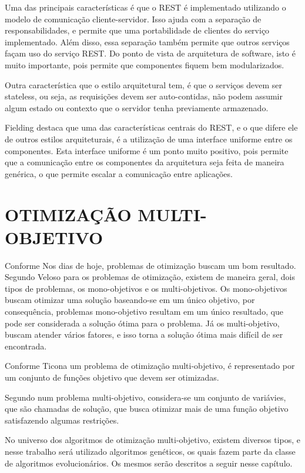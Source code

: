 Uma das principais características é que o REST é implementado utilizando o modelo de comunicação 
cliente-servidor. Isso ajuda com a separação de responsabilidades, e permite que uma portabilidade 
de clientes do serviço implementado. Além disso, essa separação também permite que outros serviços 
façam uso do serviço REST. Do ponto de vista de arquitetura de software, isto é muito importante, 
pois permite que componentes fiquem bem modularizados.

Outra característica que o estilo arquitetural tem, é que o serviços devem ser stateless, ou seja, as  
requisições devem ser auto-contidas, não podem assumir algum estado ou contexto que o servidor tenha 
previamente armazenado. 

Fielding \cite{fielding} destaca que uma das características centrais do REST, e o que difere ele 
de outros estilos arquiteturais, é a utilização de uma interface uniforme entre os componentes. 
Esta interface uniforme é um ponto muito positivo, pois permite que a comunicação entre os 
componentes da arquitetura seja feita de maneira genérica, o que permite escalar a comunicação 
entre aplicações.

\section{OTIMIZAÇÃO MULTI-OBJETIVO}  
Conforme Nos dias de hoje, problemas de otimização buscam um bom resultado.
Segundo Veloso \cite{veloso} para os problemas de otimização, existem de maneira geral, 
dois tipos de problemas, os mono-objetivos e os multi-objetivos. 
Os mono-objetivos buscam otimizar uma solução baseando-se em um único objetivo, por consequência, 
problemas mono-objetivo resultam em um único resultado, que pode ser considerada a solução ótima para o 
problema. Já os multi-objetivo, buscam atender vários fatores, e isso torna a solução ótima mais 
difícil de ser encontrada.

Conforme Ticona \cite{ticona} um problema de otimização multi-objetivo, é representado por um 
conjunto de funções objetivo que devem ser otimizadas. 

Segundo \cite{Hashimoto} num problema multi-objetivo, considera-se um conjunto de 
variávies, que são chamadas de solução, que busca otimizar mais de uma função objetivo 
satisfazendo algumas restrições. 

No universo dos algoritmos de otimização multi-objetivo, existem diversos tipos, e nesse trabalho
será utilizado algoritmos genéticos, os quais fazem parte da classe de algoritmos evolucionários.
Os mesmos serão descritos a seguir nesse capítulo.
 
